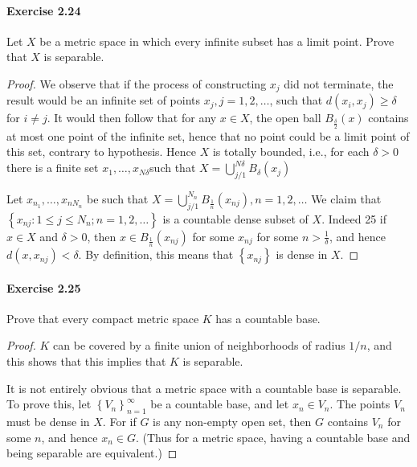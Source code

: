 \documentclass{article}
\theoremstyle{definition}
\begin{document}
\paragraph{Exercise 2.24} Let $X$ be a metric space in which every infinite subset has a limit point. Prove that $X$ is separable.
\begin{proof}
    We observe that if the process of constructing $x_j$ did not terminate, the result would be an infinite set of points $x_j, j=1,2, \ldots$, such that $d\left(x_i, x_j\right) \geq \delta$ for $i \neq j$. It would then follow that for any $x \in X$, the open ball $B_{\frac{\delta}{2}}(x)$ contains at most one point of the infinite set, hence that no point could be a limit point of this set, contrary to hypothesis. Hence $X$ is totally bounded, i.e., for each $\delta>0$ there is a finite set $x_1, \ldots, x_{N\delta}$such that $X=\bigcup_{j / 1}^{N\delta} B_\delta\left(x_j\right)$

Let $x_{n_1}, \ldots, x_{n N_n}$ be such that $X=\bigcup_{j / 1}^{N_n} B_{\frac{1}{n}}\left(x_{n j}\right), n=1,2, \ldots$ We claim that $\left\{x_{n j}: 1 \leq j \leq N_n ; n=1,2, \ldots\right\}$ is a countable dense subset of $X$. Indeed
25
if $x \in X$ and $\delta>0$, then $x \in B_{\frac{1}{n}}\left(x_{n j}\right)$ for some $x_{n j}$ for some $n>\frac{1}{\delta}$, and hence $d\left(x, x_{n j}\right)<\delta$. By definition, this means that $\left\{x_{n j}\right\}$ is dense in $X$.
\end{proof}



\paragraph{Exercise 2.25} Prove that every compact metric space $K$ has a countable base.
\begin{proof}
    $K$ can be covered by a finite union of neighborhoods of radius $1 / n$, and this shows that this implies that $K$ is separable.

It is not entirely obvious that a metric space with a countable base is separable. To prove this, let $\left\{V_n\right\}_{n=1}^{\infty}$ be a countable base, and let $x_n \in V_n$. The points $V_n$ must be dense in $X$. For if $G$ is any non-empty open set, then $G$ contains $V_n$ for some $n$, and hence $x_n \in G$. (Thus for a metric space, having a countable base and being separable are equivalent.)
\end{proof}
\end{document}
